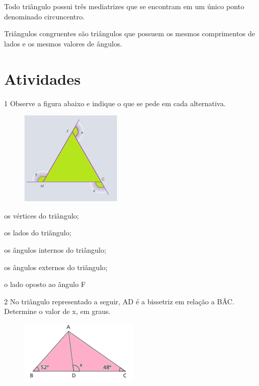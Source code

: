 {{{Todo triângulo possui três mediatrizes que se encontram em um único
ponto denominado circuncentro.

Triângulos congruentes são triângulos que possuem os mesmos comprimentos
de lados e os mesmos valores de ângulos.}

\section*{Atividades}

\num{1} Observe a figura abaixo e indique o que se pede em cada alternativa.

\begin{figure}[H]
\centering\includegraphics[width=1.88333in,height=1.75048in]{./imgSAEB_8_MAT/media/image13.png}
\end{figure}

\begin{multicols}{3}
\begin{escolha}[itemsep=0pt]
\item os vértices do triângulo;
\item os lados do triângulo;
\item os ângulos internos do triângulo;
\item os ângulos externos do triângulo;
\item o lado oposto ao ângulo F
\end{escolha}
\end{multicols}




\num{2} No triângulo representado a seguir, AD é a bissetriz em relação a
BÂC. Determine o valor de x, em graus.

\begin{figure}[H]
\centering\includegraphics[width=2.20833in,height=1.1875in]{./imgSAEB_8_MAT/media/image14.png}
\end{figure}

}}
